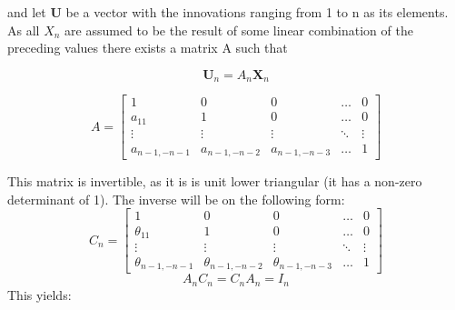 \documentclass[]{article}
\begin{document}
and let \(\mathbf{U}\) be a vector with the innovations ranging from 1
to n as its elements. As all \(X_n\) are assumed to be the result of
some linear combination of the preceding values there exists a matrix A
such that

\[\mathbf{U}_n=A_n\mathbf{X}_n\]

\[A = \left[\begin{array}{lllll}
1            & 0            & 0            & \dots & 0 \\
a_{11}       & 1            & 0            & \dots & 0 \\
\vdots       & \vdots       & \vdots       & \ddots & \vdots \\
a_{n-1,-n-1} & a_{n-1,-n-2} & a_{n-1,-n-3} & \dots & 1
\end{array}
\right]\]

This matrix is invertible, as it is is unit lower triangular (it has a
non-zero determinant of 1). The inverse will be on the following form:
\[C_n = \left[
\begin{array}{lllll}
1            & 0            & 0            & \dots & 0 \\
\theta_{11}       & 1            & 0            & \dots & 0 \\
\vdots       & \vdots       & \vdots       & \ddots & \vdots \\
\theta_{n-1,-n-1} & \theta_{n-1,-n-2} & \theta_{n-1,-n-3} & \dots & 1
\end{array}
\right]\] \[A_nC_n=C_nA_n=I_n\] This yields:
\end{document}
